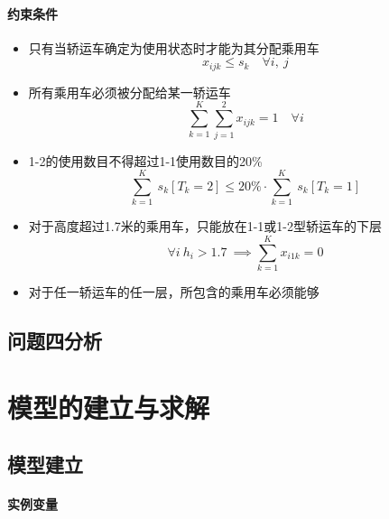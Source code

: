\documentclass[UTF8]{ctexart}
\begin{document}
\paragraph{约束条件}
	\begin{itemize}
		\item 只有当轿运车确定为使用状态时才能为其分配乘用车
		\begin{equation}
		 x_{ijk} \leq s_k  \quad 	\forall i,~ j
		\end{equation}
		
		\item 所有乘用车必须被分配给某一轿运车
		\begin{equation}
			\sum_{k=1}^{K} \sum_{j=1}^{2} x_{ijk}=1 \quad \forall i
		\end{equation}
		
		\item 1-2的使用数目不得超过1-1使用数目的20\%
		\begin{equation}
			\sum_{k=1}^{K} \ s_k[T_k=2] \leq 20\% \cdot \sum_{k=1}^{K}  \ s_k[T_k=1]
		\end{equation}
		
		\item 对于高度超过1.7米的乘用车，只能放在1-1或1-2型轿运车的下层
		\begin{equation}
			\forall i \ h_i>1.7 \ \implies \sum_{k=1}^{K}x_{i1k}=0
		\end{equation}
		
		\item 对于任一轿运车的任一层，所包含的乘用车必须能够
		
		
	\end{itemize}

	








\subsection{问题四分析}

\section{模型的建立与求解}

\subsection{模型建立}
	\paragraph{实例变量}
\end{document}
